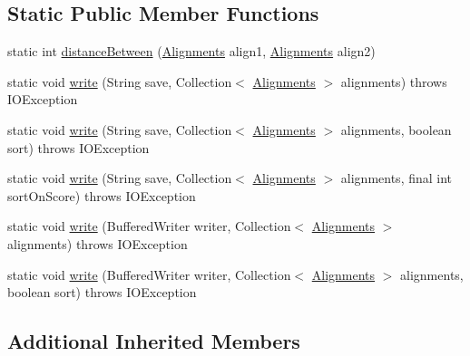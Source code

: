 \subsection*{Static Public Member Functions}
\begin{DoxyCompactItemize}
\item 
static int \hyperlink{classbroad_1_1pda_1_1datastructures_1_1_alignments_a155bf1e438f0157545539f2f49025e2c}{distance\+Between} (\hyperlink{classbroad_1_1pda_1_1datastructures_1_1_alignments}{Alignments} align1, \hyperlink{classbroad_1_1pda_1_1datastructures_1_1_alignments}{Alignments} align2)
\item 
static void \hyperlink{classbroad_1_1pda_1_1datastructures_1_1_alignments_a09ae49ab7214c65bf4fbc29b22b600dc}{write} (String save, Collection$<$ \hyperlink{classbroad_1_1pda_1_1datastructures_1_1_alignments}{Alignments} $>$ alignments)  throws I\+O\+Exception 
\item 
static void \hyperlink{classbroad_1_1pda_1_1datastructures_1_1_alignments_afe4e19224bb2cf43d71adfafb4fccad4}{write} (String save, Collection$<$ \hyperlink{classbroad_1_1pda_1_1datastructures_1_1_alignments}{Alignments} $>$ alignments, boolean sort)  throws I\+O\+Exception
\item 
static void \hyperlink{classbroad_1_1pda_1_1datastructures_1_1_alignments_ab32551a2ba3962774258f1ba15aac266}{write} (String save, Collection$<$ \hyperlink{classbroad_1_1pda_1_1datastructures_1_1_alignments}{Alignments} $>$ alignments, final int sort\+On\+Score)  throws I\+O\+Exception 
\item 
static void \hyperlink{classbroad_1_1pda_1_1datastructures_1_1_alignments_a71876361ef87484dc17ef08cf8d59a82}{write} (Buffered\+Writer writer, Collection$<$ \hyperlink{classbroad_1_1pda_1_1datastructures_1_1_alignments}{Alignments} $>$ alignments)  throws I\+O\+Exception 
\item 
static void \hyperlink{classbroad_1_1pda_1_1datastructures_1_1_alignments_adadaeaae6ef690283714036566d59a00}{write} (Buffered\+Writer writer, Collection$<$ \hyperlink{classbroad_1_1pda_1_1datastructures_1_1_alignments}{Alignments} $>$ alignments, boolean sort)  throws I\+O\+Exception 
\end{DoxyCompactItemize}
\subsection*{Additional Inherited Members}


